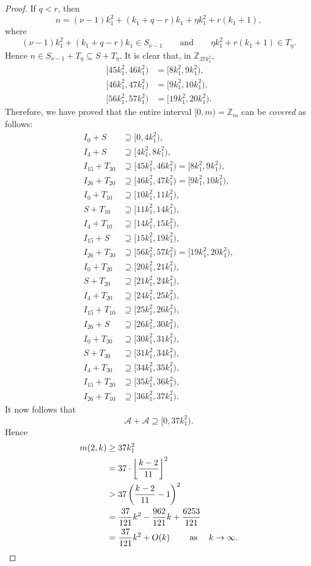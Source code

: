 \documentclass[11pt]{article}
\theoremstyle{definition}
\def\Z{\mbox{$\mathbb Z$}}
\begin{document}
\begin{proof}
If $q <r$, then
\[
n = (\nu  - 1)k_1^2 + (k_1 + q - r) k_1+\eta k_1^2 + r(k_1 + 1), 
\]
where 
\[
(\nu  - 1)k_1^2 + (k_1 + q - r)k_1 \in S_{\nu  - 1}\qquad\text{and}\qquad
\eta k_1^2 + r(k_1 + 1) \in T_\eta.
\]
Hence $n \in S_{\nu-1}+T_\eta\subseteq S+T_{\eta}$. 
It is clear that, in $\Z_{37k_{1}^{2}}$,
\begin{align*}
[45k_{1}^{2},46k_{1}^{2})&=[8k_1^2, 9k_1^2),\\
[46k_{1}^{2},47k_{1}^{2})&=[9k_1^2, 10k_1^2),\\
[56k_{1}^{2},57k_{1}^{2})&=[19k_1^2, 20k_1^2).
\end{align*}
Therefore, we have proved that the entire interval $[0, m)=\Z_{m}$ can be  {\em covered\/} as follows: 
\begin{align*}
I_0 + S  &\supseteq [0, 4k_1^2),\\
I_4 + S  &\supseteq [4k_1^2, 8k_1^2),\\
I_{15} + T_{30}  &\supseteq[45k_{1}^{2},46k_{1}^{2})= [8k_1^2, 9k_1^2),\\
I_{26} + T_{20}  &\supseteq[46k_{1}^{2},47k_{1}^{2})= [9k_1^2, 10k_1^2),\\
I_{0}+T_{10}  &\supseteq [10k_1^2, 11k_1^2),\\
S+T_{10}  &\supseteq [11k_1^2, 14k_1^2),\\
I_{4} + T_{10}  &\supseteq [14k_1^2, 15k_1^2),\\
I_{15} + S  &\supseteq [15k_1^2, 19k_1^2),\\
I_{26} + T_{30}  &\supseteq[56k_{1}^{2},57k_{1}^{2})= [19k_1^2, 20k_1^2),\\
I_{0} + T_{20}  &\supseteq [20k_1^2, 21k_1^2),\\
S + T_{20}  &\supseteq [21k_1^2, 24k_1^2),\\
I_{4} + T_{20}  &\supseteq [24k_1^2, 25k_1^2),\\
I_{15} + T_{10}  &\supseteq [25k_1^2, 26k_1^2),\\
I_{26} + S  &\supseteq [26k_1^2, 30k_1^2),\\
I_{0} + T_{30}  &\supseteq [30k_1^2, 31k_1^2),\\
S + T_{30}  &\supseteq [31k_1^2, 34k_1^2),\\
I_{4} + T_{30}  &\supseteq [34k_1^2, 35k_1^2),\\
I_{15} + T_{20}  &\supseteq [35k_1^2, 36k_1^2),\\
I_{26} + T_{10}  &\supseteq [36k_1^2, 37k_1^2).
\end{align*}
It now follows that 
\[
\mathcal{A} + \mathcal{A} \supseteq [0, 37k_1^2).
\]
Hence
\begin{align*}
m(2,k) &\geq 37k_1^2\\
&= 37 \cdot \left \lfloor \frac{k - 2}{11}\right \rfloor^2\\
&> 37 \left(\frac{k - 2}{11} -1\right) ^2\\
&= \frac{37}{121}k^2-\frac{962}{121}k+\frac{6253}{121}\\
&= \frac{37}{121}k^2 + O(k)\qquad \text{ as }\quad k \to \infty. \qedhere
\end{align*}
\end{proof}
\end{document}
